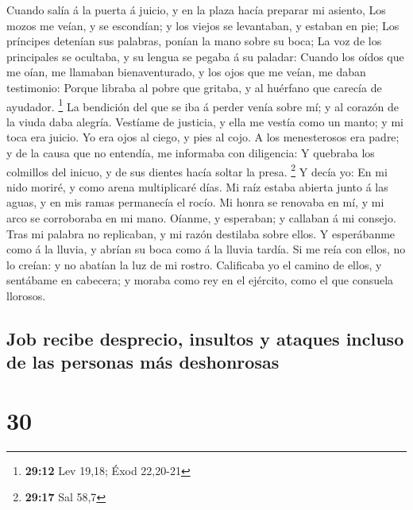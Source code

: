  Cuando salía á la puerta á juicio, y en la plaza hacía
preparar mi asiento,  Los mozos me veían, y se escondían;
y los viejos se levantaban, y estaban en pie;  Los
príncipes detenían sus palabras, ponían la mano sobre su boca;
 La voz de los principales se ocultaba, y su lengua se
pegaba á su paladar:  Cuando los oídos que me oían, me
llamaban bienaventurado, y los ojos que me veían, me daban testimonio:
 Porque libraba al pobre que gritaba, y al huérfano que
carecía de ayudador. \footnote{\textbf{29:12} Lev 19,18; Éxod 22,20-21}
 La bendición del que se iba á perder venía sobre mí; y
al corazón de la viuda daba alegría.  Vestíame de
justicia, y ella me vestía como un manto; y mi toca era juicio.
 Yo era ojos al ciego, y pies al cojo.  A
los menesterosos era padre; y de la causa que no entendía, me informaba
con diligencia:  Y quebraba los colmillos del inicuo, y
de sus dientes hacía soltar la presa. \footnote{\textbf{29:17} Sal 58,7}
 Y decía yo: En mi nido moriré, y como arena multiplicaré
días.  Mi raíz estaba abierta junto á las aguas, y en mis
ramas permanecía el rocío.  Mi honra se renovaba en mí, y
mi arco se corroboraba en mi mano.  Oíanme, y esperaban;
y callaban á mi consejo.  Tras mi palabra no replicaban,
y mi razón destilaba sobre ellos.  Y esperábanme como á
la lluvia, y abrían su boca como á la lluvia tardía.  Si
me reía con ellos, no lo creían: y no abatían la luz de mi rostro.
 Calificaba yo el camino de ellos, y sentábame en
cabecera; y moraba como rey en el ejército, como el que consuela
llorosos.

\hypertarget{job-recibe-desprecio-insultos-y-ataques-incluso-de-las-personas-muxe1s-deshonrosas}{%
\subsection{Job recibe desprecio, insultos y ataques incluso de las
personas más
deshonrosas}\label{job-recibe-desprecio-insultos-y-ataques-incluso-de-las-personas-muxe1s-deshonrosas}}

\hypertarget{section-29}{%
\section{30}\label{section-29}}

